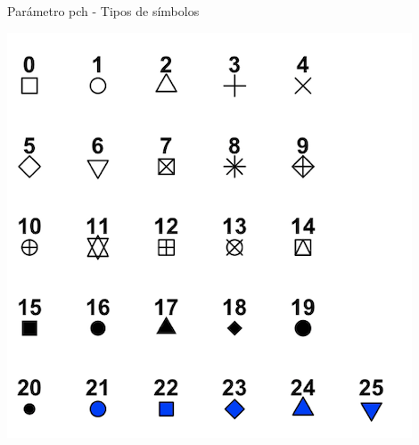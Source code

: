 \documentclass[
  ignorenonframetext,
]{beamer}
\begin{document}
\begin{frame}{Parámetro pch - Tipos de símbolos}
\label{paruxe1metro-pch---tipos-de-suxedmbolos}
\begin{center}\includegraphics[width=0.6\linewidth]{Imgs/pch} \end{center}
\end{frame}
\end{document}
